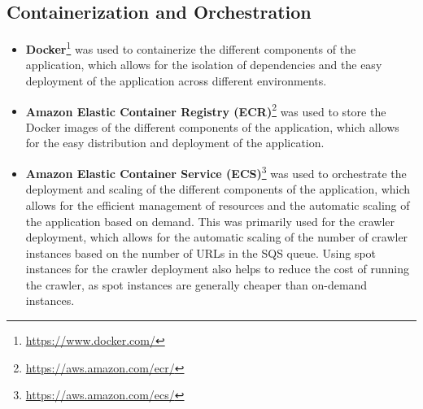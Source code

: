 \subsection{Containerization and Orchestration}\label{subsec:containerization_and_orchestration}
\begin{itemize}
    \item \textbf{Docker}\footnote{\url{https://www.docker.com/}} was used to containerize the different components of the application, which allows for the isolation of dependencies and the easy deployment of the application across different environments.

    \item \textbf{Amazon Elastic Container Registry (ECR)}\footnote{\url{https://aws.amazon.com/ecr/}} was used to store the Docker images of the different components of the application, which allows for the easy distribution and deployment of the application.

    \item \textbf{Amazon Elastic Container Service (ECS)}\footnote{\url{https://aws.amazon.com/ecs/}} was used to orchestrate the deployment and scaling of the different components of the application, which allows for the efficient management of resources and the automatic scaling of the application based on demand.
    This was primarily used for the crawler deployment, which allows for the automatic scaling of the number of crawler instances based on the number of URLs in the SQS queue.
    Using spot instances for the crawler deployment also helps to reduce the cost of running the crawler, as spot instances are generally cheaper than on-demand instances.
\end{itemize}

